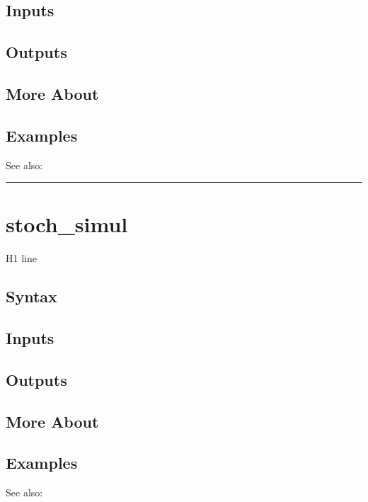 \documentclass[letterpaper,10pt,english]{sphinxmanual}
\begin{document}
\subsection{Inputs}
\label{classes/models/@dsge/dsge:id217}

\subsection{Outputs}
\label{classes/models/@dsge/dsge:id218}

\subsection{More About}
\label{classes/models/@dsge/dsge:id219}

\subsection{Examples}
\label{classes/models/@dsge/dsge:id220}
See also:


\bigskip\hrule{}\bigskip



\section{stoch\_simul}
\label{classes/models/@dsge/dsge:id221}\label{classes/models/@dsge/dsge:stoch-simul}
H1 line


\subsection{Syntax}
\label{classes/models/@dsge/dsge:id222}

\subsection{Inputs}
\label{classes/models/@dsge/dsge:id223}

\subsection{Outputs}
\label{classes/models/@dsge/dsge:id224}

\subsection{More About}
\label{classes/models/@dsge/dsge:id225}

\subsection{Examples}
\label{classes/models/@dsge/dsge:id226}
See also:
\end{document}
